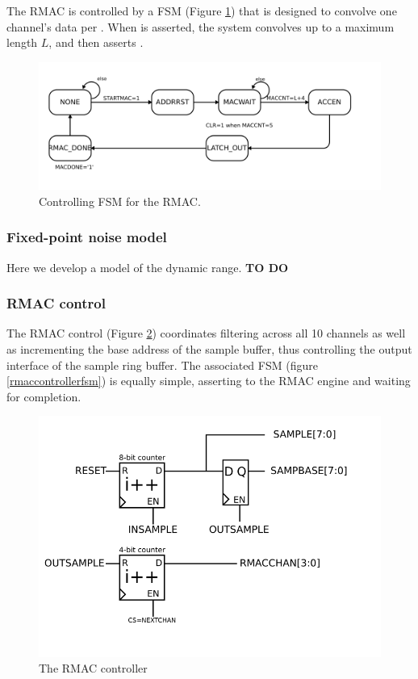 The RMAC is controlled by a FSM (Figure \ref{rmacfsm}) that is designed to convolve one channel's data per . When  is asserted, the system convolves up to a maximum length $L$, and then asserts . 

\begin{figure}
\label{rmacfsm}
\includegraphics[scale=0.7]{RMAC_fsm.svg}
\caption{Controlling FSM for the RMAC.}
\end{figure}


\subsubsection{Fixed-point noise model} 
Here we develop a model of the dynamic range. \textbf{TO DO } 

\subsubsection{RMAC control}
The RMAC control (Figure \ref{rmaccontroller}) coordinates filtering
across all 10 channels as well as incrementing the base address of the
sample buffer, thus controlling the output interface of the sample
ring buffer. The associated FSM (figure \ref{rmaccontrollerfsm}) is
equally simple, asserting  to the RMAC engine and
waiting for completion.

\begin{figure}
\label{rmaccontroller}
\includegraphics[scale=0.7]{RMACcontrol.svg}
\caption{The RMAC controller}
\end{figure}

